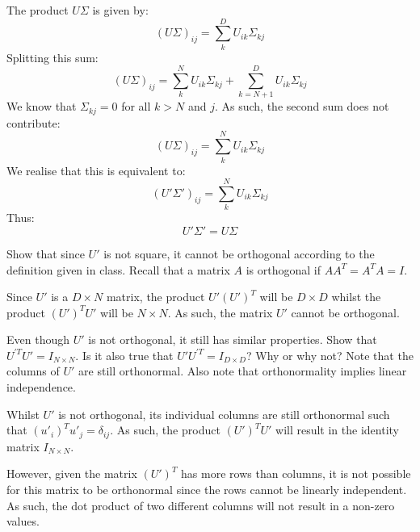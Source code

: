 \begin{solution}
 The product $U\Sigma$ is given by:
 \begin{equation}
	 (U\Sigma)_{ij} = \sum_k^D U_{ik}\Sigma_{kj}
 \end{equation}
 Splitting this sum:
 \begin{equation}
	(U\Sigma)_{ij} = \sum_k^N U_{ik}\Sigma_{kj} +\sum_{k=N+1}^D U_{ik}\Sigma_{kj} 
 \end{equation}
 We know that $\Sigma_{kj}=0$ for all $k>N$ and $j$. As such, the second sum does not contribute:
 \begin{equation}
	(U\Sigma)_{ij} = \sum_k^N U_{ik}\Sigma_{kj}
 \end{equation}
 We realise that this is equivalent to:
 \begin{equation}
	 (U'\Sigma')_{ij} = \sum_k^N U_{ik}\Sigma_{kj}
 \end{equation}
 Thus:
 \begin{equation}
	 U'\Sigma' = U\Sigma
 \end{equation}
\end{solution}

\problem[3] Show that since $U'$ is not square, it cannot be orthogonal according to the definition given in class. Recall that a matrix $A$ is orthogonal if $A A^T = A^T A = I$.

\begin{solution}
 Since $U'$ is a $D\times N$ matrix, the product $U'(U')^T$ will be $D\times D$ whilst the product $(U')^TU'$ will be $N\times N$. As such, the matrix $U'$ cannot be orthogonal.
\end{solution} 

\problem[4] Even though $U'$ is not orthogonal, it still has similar properties. Show that $U^{'T} U' = I_{N \times N}$. Is it also true that $U' U^{'T} = I_{D \times D}$? Why or why not? Note that the columns of $U'$ are still orthonormal. Also note that orthonormality implies linear independence.

\begin{solution}
 Whilst $U'$ is not orthogonal, its individual columns are still orthonormal such that $(u'_i)^Tu'_j=\delta_{ij}$. As such, the product $(U')^TU'$ will result in the identity matrix $I_{N\times N}$. 

 However, given the matrix $(U')^T$ has more rows than columns, it is not possible for this matrix to be orthonormal since the rows cannot be linearly independent. As such, the dot product of two different columns will not result in a non-zero values.
\end{solution}

